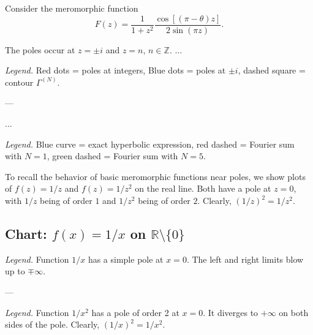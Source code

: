 \begin{problem}[CP-IV-0110]
\label{prob:cp-iv-0110}
Consider the meromorphic function
\[
F(z) = \frac{1}{1+z^2} \frac{\cos[(\pi-\theta)z]}{2\sin(\pi z)}.
\]

The poles occur at $z=\pm i$ and $z=n$, $n\in\mathbb{Z}$.
...

\begin{center}

\end{center}

\textit{Legend.} Red dots = poles at integers, Blue dots = poles at $\pm i$, dashed square = contour $\Gamma^{(N)}$.

---

...

\begin{center}

\end{center}

\textit{Legend.} Blue curve = exact hyperbolic expression, red dashed = Fourier sum with $N=1$, green dashed = Fourier sum with $N=5$.

	To recall the behavior of basic meromorphic functions near poles,
	we show plots of $f(z) = 1/z$ and $f(z) = 1/z^2$ on the real line.
	Both have a pole at $z=0$, with $1/z$ being of order $1$ and
	$1/z^2$ being of order $2$. Clearly, $(1/z)^2 = 1/z^2$.

	\subsection*{Chart: $f(x)=1/x$ on $\mathbb{R}\setminus\{0\}$}
	\begin{center}

		\hspace{1cm}

	\end{center}

	\textit{Legend.} Function $1/x$ has a simple pole at $x=0$. The left and right limits
	blow up to $\mp\infty$.

	---

	\begin{center}

		\hspace{1cm}

	\end{center}

	\textit{Legend.} Function $1/x^2$ has a pole of order 2 at $x=0$.
	It diverges to $+\infty$ on both sides of the pole.
	Clearly, $(1/x)^2 = 1/x^2$.


\end{problem}
